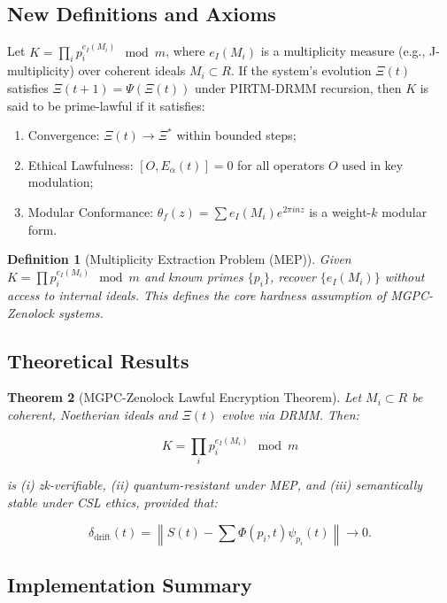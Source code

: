 \documentclass[12]{amsart}
\theoremstyle{plain}
\newtheorem{theorem}{Theorem}[section]
\newtheorem{definition}[theorem]{Definition}
\begin{document}
\subsection{New Definitions and Axioms}

\begin{axiom}
Let $K = \prod_{i} p_i^{e_I(M_i)} \mod m$, where $e_I(M_i)$ is a multiplicity measure (e.g., J-multiplicity) over coherent ideals $M_i \subset R$. If the system's evolution $\Xi(t)$ satisfies $\Xi(t+1) = \Psi(\Xi(t))$ under PIRTM-DRMM recursion, then $K$ is said to be prime-lawful if it satisfies:

\begin{enumerate}
    \item Convergence: $\Xi(t) \to \Xi^*$ within bounded steps;
    \item Ethical Lawfulness: $[O, E_\alpha(t)] = 0$ for all operators $O$ used in key modulation;
    \item Modular Conformance: $\theta_f(z) = \sum e_I(M_i) e^{2\pi i n z}$ is a weight-$k$ modular form.
\end{enumerate}
\end{axiom}

\begin{definition}[Multiplicity Extraction Problem (MEP)]
Given $K = \prod p_i^{e_I(M_i)} \mod m$ and known primes $\{p_i\}$, recover $\{e_I(M_i)\}$ without access to internal ideals. This defines the core hardness assumption of MGPC-Zenolock systems.
\end{definition}

\subsection{Theoretical Results}

\begin{theorem}[MGPC-Zenolock Lawful Encryption Theorem]
Let $M_i \subset R$ be coherent, Noetherian ideals and $\Xi(t)$ evolve via DRMM. Then:

\[
K = \prod_i p_i^{e_I(M_i)} \mod m
\]

is (i) zk-verifiable, (ii) quantum-resistant under MEP, and (iii) semantically stable under CSL ethics, provided that:

\[
\delta_{\text{drift}}(t) = \left\| S(t) - \sum \Phi(p_i,t)\psi_{p_i}(t) \right\| \to 0.
\]

\end{theorem}

\subsection{Implementation Summary}
\end{document}
